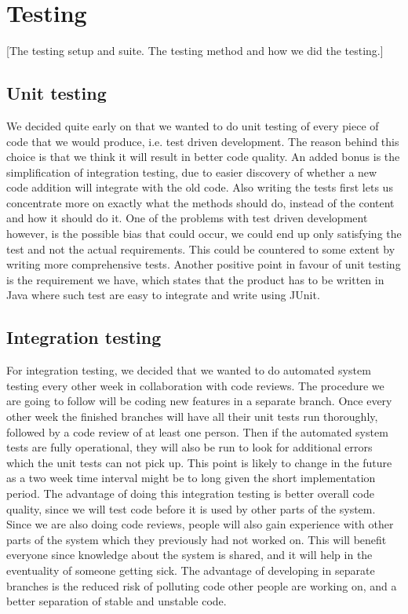 \section{Testing}\label{Testing}
    [The testing setup and suite. The testing method and how we did the testing.]
    
    \subsection{Unit testing}\label{Unit testing}
    We decided quite early on that we wanted to do unit testing of every piece of code that we would produce, i.e. test driven development. The reason behind this choice is that we think it will result in better code quality. An added bonus is the simplification of integration testing, due to easier discovery of whether a new code addition will integrate with the old code. Also writing the tests first lets us concentrate more on exactly what the methods should do, instead of the content and how it should do it. One of the problems with test driven development however, is the possible bias that could occur, we could end up only satisfying the test and not the actual requirements. This could be countered to some extent by writing more comprehensive tests. Another positive point in favour of unit testing is the requirement we have, which states that the product has to be written in Java where such test are easy to integrate and write using JUnit.

    \subsection{Integration testing}\label{Integration testing}
   For integration testing, we decided that we wanted to do automated system testing every other week in collaboration with code reviews. The procedure we are going to follow will be coding new features in a separate branch. Once every other week the finished branches will have all their unit tests run thoroughly, followed by a code review of at least one person. Then if the automated system tests are fully operational, they will also be run to look for additional errors which the unit tests can not pick up. This point is likely to change in the future as a two week time interval might be to long given the short implementation period. The advantage of doing this integration testing is better overall code quality, since we will test code before it is used by other parts of the system. Since we are also doing code reviews, people will also gain experience with other parts of the system which they previously had not worked on. This will benefit everyone since knowledge about the system is shared, and it will help in the eventuality of someone getting sick. The advantage of developing in separate branches is the reduced risk of polluting code other people are working on, and a better separation of stable and unstable code.

